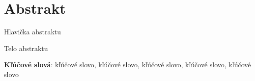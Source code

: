 \section*{Abstrakt}

Hlavička abstraktu

\medbreak

Telo abstraktu

\medbreak
\noindent
\textbf{Kľúčové slová}: kľúčové slovo, kľúčové slovo, kľúčové slovo, kľúčové slovo, kľúčové slovo